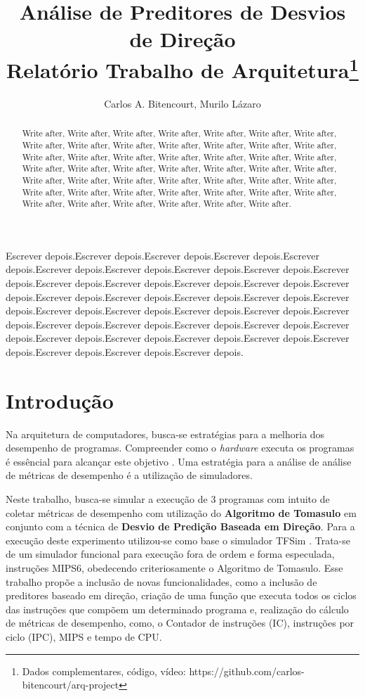 \documentclass[12pt]{article}
\title{Análise de Preditores de Desvios de Direção\\ Relatório Trabalho de Arquitetura\footnote{Dados complementares, código, vídeo: https://github.com/carlos-bitencourt/arq-project}}
\author{Carlos A. Bitencourt\inst{1}, Murilo Lázaro\inst{1}}
\begin{document}
\maketitle

\begin{abstract}
  Write after,   Write after, Write after, Write after, Write after, Write after, Write after, Write after, Write after, Write after, Write after, Write after, Write after, Write after, Write after, Write after, Write after, Write after, Write after, Write after, Write after, Write after, Write after, Write after, Write after, Write after, Write after, Write after, Write after, Write after, Write after, Write after, Write after, Write after, Write after, Write after, Write after, Write after, Write after, Write after, Write after, Write after, Write after, Write after, Write after, Write after, Write after, Write after.
\end{abstract}

\begin{resumo}
  Escrever depois.Escrever depois.Escrever depois.Escrever depois.Escrever depois.Escrever depois.Escrever depois.Escrever depois.Escrever depois.Escrever depois.Escrever depois.Escrever depois.Escrever depois.Escrever depois.Escrever depois.Escrever depois.Escrever depois.Escrever depois.Escrever depois.Escrever depois.Escrever depois.Escrever depois.Escrever depois.Escrever depois.Escrever depois.Escrever depois.Escrever depois.Escrever depois.Escrever depois.Escrever depois.Escrever depois.Escrever depois.Escrever depois.Escrever depois.Escrever depois.Escrever depois.Escrever depois.Escrever depois.

\end{resumo}

\section{Introdução}


Na arquitetura de computadores, busca-se estratégias para a melhoria dos desempenho de programas. Compreender como o \textit{hardware} executa os programas é essêncial para alcançar este objetivo \cite{patterson:2014}. Uma estratégia para a análise de análise de métricas de desempenho é a utilização de simuladores.

Neste trabalho, busca-se simular a execução de 3 programas com intuito de coletar métricas de desempenho com utilização do \textbf{Algoritmo de Tomasulo} em conjunto com a  técnica de \textbf{Desvio de Predição Baseada em Direção}. Para a execução deste experimento utilizou-se como base o simulador TFSim \cite{lucas:2019}. Trata-se de um simulador funcional para execução fora de ordem e forma especulada, instruções MIPS6, obedecendo criteriosamente o Algoritmo de Tomasulo. Esse trabalho propõe a inclusão de novas funcionalidades, como a inclusão de preditores baseado em direção, criação de uma função que executa todos os ciclos das instruções que compõem um determinado programa e, realização do cálculo de métricas de desempenho, como, o Contador de instruções (IC), instruções por ciclo (IPC), MIPS e tempo de CPU.
\end{document}
